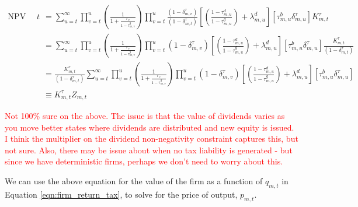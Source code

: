 \documentclass[letterpaper,12pt]{article}
\theoremstyle{definition}
\begin{document}
\begin{spacing}{1.5}
\begin{equation}
\label{eqn:NPV_deprec}
\begin{split}
\text{NPV deprec at $t$} & = \sum_{u=t}^{\infty} \prod_{v=t}^{u} \left(\frac{1}{1+\frac{r_{v}}{1-\tau^{g}_{m,v}}} \right) \prod_{v=t}^{u}\frac{(1-\delta^{\tau}_{m,v})}{(1-\delta^{\tau}_{m,t})} \left[\left(\frac{1-\tau^{d}_{m,u}}{1-\tau^{g}_{m,u}}  \right) + \lambda^{d}_{m,u} \right] \left[ \tau^{b}_{m,u}\delta^{\tau}_{m,u} \right]K^{\tau}_{m,t} \\
& = \sum_{u=t}^{\infty} \prod_{v=t}^{u} \left(\frac{1}{1+\frac{r_{v}}{1-\tau^{g}_{m,v}}} \right) \prod_{v=t}^{u}(1-\delta^{\tau}_{m,v}) \left[\left(\frac{1-\tau^{d}_{m,u}}{1-\tau^{g}_{m,u}}  \right) + \lambda^{d}_{m,u} \right] \left[ \tau^{b}_{m,u}\delta^{\tau}_{m,u} \right]\frac{K^{\tau}_{m,t}}{(1-\delta^{\tau}_{m,t})} \\
& = \frac{K^{\tau}_{m,t}}{(1-\delta^{\tau}_{m,t})} \sum_{u=t}^{\infty} \prod_{v=t}^{u} \left(\frac{1}{1+\frac{r_{v}}{1-\tau^{g}_{m,v}}} \right) \prod_{v=t}^{u}(1-\delta^{\tau}_{m,v}) \left[\left(\frac{1-\tau^{d}_{m,u}}{1-\tau^{g}_{m,u}}  \right) + \lambda^{d}_{m,u} \right] \left[ \tau^{b}_{m,u}\delta^{\tau}_{m,u} \right] \\
& \equiv K^{\tau}_{m,t} Z_{m,t}
\end{split}
\end{equation}

\textcolor{red}{Not 100\% sure on the above.  The issue is that the value of dividends varies as you move better states where dividends are distributed and new equity is issued.  I think the multiplier on the dividend non-negativity constraint captures this, but not sure.  Also, there may be issue about when no tax liability is generated - but since we have deterministic firms, perhaps we don't need to worry about this.}

We can use the above equation for the value of the firm as a function of $q_{m,t}$  in Equation \ref{eqn:firm_return_tax},  to solve for the price of output, $p_{m,t}$.


\end{spacing}
\end{document}
